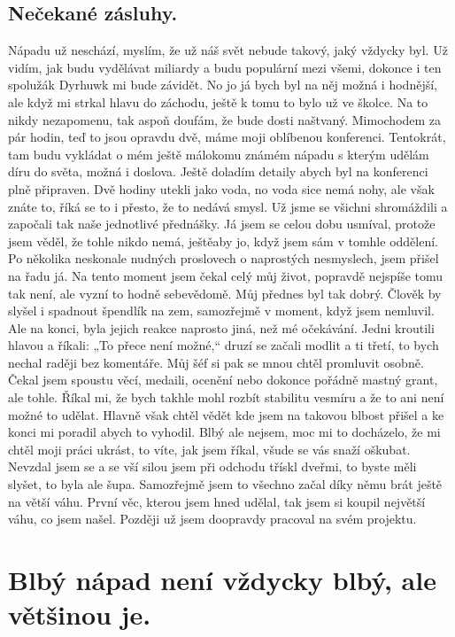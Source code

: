 \section{Nečekané zásluhy.}

Nápadu už neschází, myslím, že už náš svět nebude takový, jaký vždycky byl. Už vidím, jak budu vydělávat miliardy a budu populární mezi všemi, dokonce i ten spolužák Dyrhuwk mi bude závidět. No jo já bych byl na něj možná i hodnější, ale když mi strkal hlavu do záchodu, ještě k tomu to bylo už ve školce. Na to nikdy nezapomenu, tak aspoň doufám, že bude dosti naštvaný. Mimochodem za pár hodin, teď to jsou opravdu dvě, máme moji oblíbenou konferenci. Tentokrát, tam budu vykládat o mém ještě málokomu známém nápadu s kterým udělám díru do světa, možná i doslova. Ještě doladím detaily abych byl na konferenci plně připraven. Dvě hodiny utekli jako voda, no voda sice nemá nohy, ale však znáte to, říká se to i přesto, že to nedává smysl. Už jsme se všichni shromáždili a započali tak naše jednotlivé přednášky. Já jsem se celou dobu usmíval, protože jsem věděl, že tohle nikdo nemá, ještěaby jo, když jsem sám v tomhle oddělení. Po několika neskonale nudných proslovech o naprostých nesmyslech, jsem přišel na řadu já. Na tento moment jsem čekal celý můj život, popravdě nejspíše tomu tak není, ale vyzní to hodně sebevědomě. Můj přednes byl tak dobrý. Člověk by slyšel i spadnout špendlík na zem, samozřejmě v moment, když jsem nemluvil. Ale na konci, byla jejich reakce naprosto jiná, než mé očekávání. Jedni kroutili hlavou a říkali: „To přece není možné,“ druzí se začali modlit a ti třetí, to bych nechal raději bez komentáře. Můj šéf si pak se mnou chtěl promluvit osobně. Čekal jsem spoustu věcí, medaili, ocenění nebo dokonce pořádně mastný grant, ale tohle. Říkal mi, že bych takhle mohl rozbít stabilitu vesmíru a že to ani není možné to udělat. Hlavně však chtěl vědět kde jsem na takovou blbost přišel a ke konci mi poradil abych to vyhodil. Blbý ale nejsem, moc mi to docházelo, že mi chtěl moji práci ukrást, to víte, jak jsem říkal, všude se vás snaží oškubat. Nevzdal jsem se a se vší silou jsem při odchodu třískl dveřmi, to byste měli slyšet, to byla ale šupa. Samozřejmě jsem to všechno začal díky němu brát ještě na větší váhu. První věc, kterou jsem hned udělal, tak jsem si koupil největší váhu, co jsem našel. Později už jsem doopravdy pracoval na svém projektu.

\chapter{Blbý nápad není vždycky blbý, ale většinou je.}

